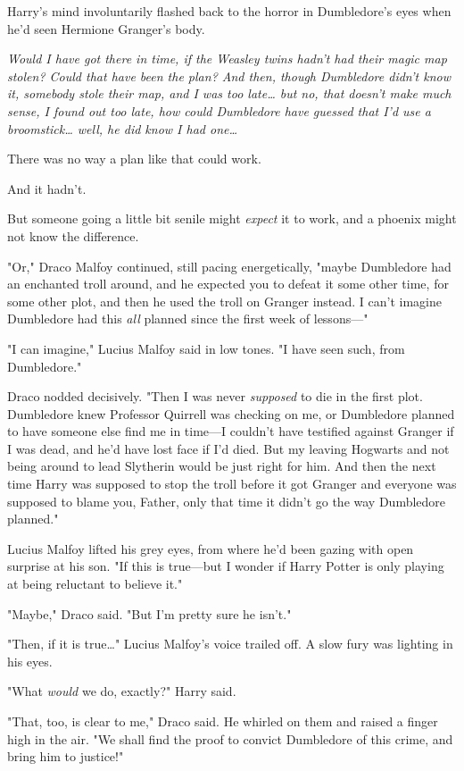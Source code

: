 Harry's mind involuntarily flashed back to the horror in Dumbledore's eyes when
he'd seen Hermione Granger's body.

\emph{Would I have got there in time, if the Weasley twins hadn't had their
magic map stolen? Could that have been the plan? And then, though Dumbledore
didn't know it, somebody stole their map, and I was too late{\ldots} but no,
that doesn't make much sense, I found out too late, how could Dumbledore have
guessed that I'd use a broomstick{\ldots} well, he did know I had one{\ldots}}

There was no way a plan like that could work.

And it hadn't.

But someone going a little bit senile might \emph{expect} it to work, and a
phoenix might not know the difference.

"Or," Draco Malfoy continued, still pacing energetically, "maybe Dumbledore had
an enchanted troll around, and he expected you to defeat it some other time,
for some other plot, and then he used the troll on Granger instead. I can't
imagine Dumbledore had this \emph{all} planned since the first week of
lessons---"

"I can imagine," Lucius Malfoy said in low tones. "I have seen such, from
Dumbledore."

Draco nodded decisively. "Then I was never \emph{supposed} to die in the first
plot. Dumbledore knew Professor Quirrell was checking on me, or Dumbledore
planned to have someone else find me in time---I couldn't have testified
against Granger if I was dead, and he'd have lost face if I'd died. But my
leaving Hogwarts and not being around to lead Slytherin would be just right for
him. And then the next time Harry was supposed to stop the troll before it got
Granger and everyone was supposed to blame you, Father, only that time it
didn't go the way Dumbledore planned."

Lucius Malfoy lifted his grey eyes, from where he'd been gazing with open
surprise at his son. "If this is true---but I wonder if Harry Potter is only
playing at being reluctant to believe it."

"Maybe," Draco said. "But I'm pretty sure he isn't."

"Then, if it is true{\ldots}" Lucius Malfoy's voice trailed off. A slow fury
was lighting in his eyes.

"What \emph{would} we do, exactly?" Harry said.

"That, too, is clear to me," Draco said. He whirled on them and raised a finger
high in the air. "We shall find the proof to convict Dumbledore of this crime,
and bring him to justice!"

